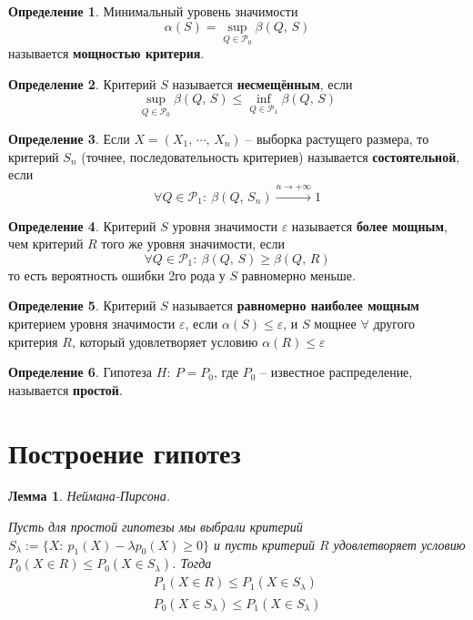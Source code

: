 \documentclass[a4paper,12pt]{article}
\renewcommand{\leq}{\ensuremath{\leqslant}}
\renewcommand{\geq}{\ensuremath{\geqslant}}
\theoremstyle{plain}
\newtheorem{lemma}{Лемма}[section]
\theoremstyle{definition}
\newtheorem{definition}{Определение}[section]
\theoremstyle{remark}
\begin{document}
\begin{definition}
  Минимальный уровень значимости 
  \[
    \alpha(S) = \sup_{Q \in \mathcal{P}_0}\beta(Q,\, S)
  \]
  называется \textbf{мощностью критерия}.
\end{definition}

\begin{definition}
  Критерий $S$ называется \textbf{несмещённым}, если
  \[
    \sup_{Q \in \mathcal{P}_0}\beta(Q,\,S) \leq \inf_{Q \in \mathcal{P}_1}\beta(Q,\, S)
  \]
\end{definition}

\begin{definition}
  Если $X = (X_1,\,\cdots,\,X_n)$ -- выборка растущего размера, то критерий $S_n$ (точнее, последовательность критериев) называется \textbf{состоятельной}, если
  \[
    \forall Q \in \mathcal{P}_1 :\: \beta(Q,\, S_n) \overset{n \to +\infty}{\to} 1  
  \]
\end{definition}

\begin{definition}
  Критерий $S$ уровня значимости $\varepsilon$ называется \textbf{более мощным}, чем критерий $R$ того же уровня значимости, если
  \[
    \forall Q \in \mathcal{P}_1 :\: \beta(Q,\,S) \geq \beta(Q,\, R)
  \]
  то есть вероятность ошибки 2го рода у $S$ равномерно меньше.
\end{definition}

\begin{definition}
  Критерий $S$ называется \textbf{равномерно наиболее мощным} критерием уровня значимости $\varepsilon$, если $\alpha(S) \leq \varepsilon$, и $S$ мощнее $\forall$ другого критерия $R$, который удовлетворяет условию $\alpha(R) \leq \varepsilon$
\end{definition}

\begin{definition}
  Гипотеза $H :\: P = P_0$, где $P_0$ -- известное распределение, называется \textbf{простой}.
\end{definition}

\section{Построение гипотез}
\begin{lemma}
  Неймана-Пирсона.

  Пусть для простой гипотезы мы выбрали критерий $S_\lambda := \{X :\: p_1(X) - \lambda p_0(X) \geq 0\}$ и пусть критерий $R$ удовлетворяет условию $P_0(X \in R) \leq P_0(X \in S_\lambda)$. Тогда
  \begin{align*}
    P_1(X \in R) \leq P_1(X \in S_\lambda)\\
    P_0(X \in S_\lambda) \leq P_1(X \in S_\lambda)
  \end{align*}
\end{lemma}
\end{document}
